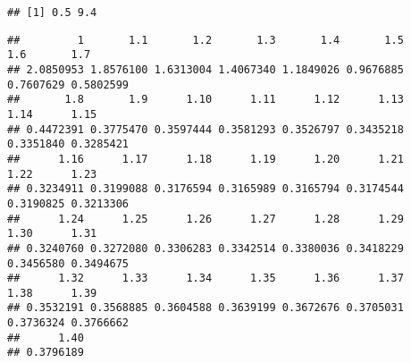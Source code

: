 \documentclass[
]{article}
\newenvironment{Shaded}{\begin{snugshade}}{\end{snugshade}}
\newcommand{\AttributeTok}[1]{\textcolor[rgb]{0.77,0.63,0.00}{#1}}
\newcommand{\DecValTok}[1]{\textcolor[rgb]{0.00,0.00,0.81}{#1}}
\newcommand{\FloatTok}[1]{\textcolor[rgb]{0.00,0.00,0.81}{#1}}
\newcommand{\FunctionTok}[1]{\textcolor[rgb]{0.00,0.00,0.00}{#1}}
\newcommand{\NormalTok}[1]{#1}
\newcommand{\OtherTok}[1]{\textcolor[rgb]{0.56,0.35,0.01}{#1}}
\newcommand{\SpecialCharTok}[1]{\textcolor[rgb]{0.00,0.00,0.00}{#1}}
\newcommand{\StringTok}[1]{\textcolor[rgb]{0.31,0.60,0.02}{#1}}
\begin{document}
\begin{verbatim}
## [1] 0.5 9.4
\end{verbatim}

\begin{Shaded}
\end{Shaded}

\begin{verbatim}
##         1       1.1       1.2       1.3       1.4       1.5       1.6       1.7 
## 2.0850953 1.8576100 1.6313004 1.4067340 1.1849026 0.9676885 0.7607629 0.5802599 
##       1.8       1.9      1.10      1.11      1.12      1.13      1.14      1.15 
## 0.4472391 0.3775470 0.3597444 0.3581293 0.3526797 0.3435218 0.3351840 0.3285421 
##      1.16      1.17      1.18      1.19      1.20      1.21      1.22      1.23 
## 0.3234911 0.3199088 0.3176594 0.3165989 0.3165794 0.3174544 0.3190825 0.3213306 
##      1.24      1.25      1.26      1.27      1.28      1.29      1.30      1.31 
## 0.3240760 0.3272080 0.3306283 0.3342514 0.3380036 0.3418229 0.3456580 0.3494675 
##      1.32      1.33      1.34      1.35      1.36      1.37      1.38      1.39 
## 0.3532191 0.3568885 0.3604588 0.3639199 0.3672676 0.3705031 0.3736324 0.3766662 
##      1.40 
## 0.3796189
\end{verbatim}
\end{document}
